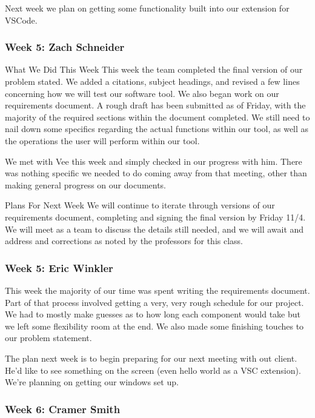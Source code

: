 Next week we plan on getting some functionality built into our extension for VSCode.

\subsubsection{Week 5: Zach Schneider}

What We Did This Week
This week the team completed the final version of our problem stated. We added a citations, subject headings, and revised a few lines concerning how we will test our software tool. We also began work on our requirements document. A rough draft has been submitted as of Friday, with the majority of the required sections within the document completed. We still need to nail down some specifics regarding the actual functions within our tool, as well as the operations the user will perform within our tool. 

We met with Vee this week and simply checked in our progress with him. There was nothing specific we needed to do coming away from that meeting, other than making general progress on our documents.

Plans For Next Week
We will continue to iterate through versions of our requirements document, completing and signing the final version by Friday 11/4. We will meet as a team to discuss the details still needed, and we will await and address and corrections as noted by the professors for this class.


\subsubsection{Week 5: Eric Winkler}

This week the majority of our time was spent writing the requirements document. Part of that process involved getting a very, very rough schedule for our project. We had to mostly make guesses as to how long each component would take but we left some flexibility room at the end. We also made some finishing touches to our problem statement. 

The plan next week is to begin preparing for our next meeting with out client. He'd like to see something on the screen (even hello world as a VSC extension). We're planning on getting our windows set up.

\subsubsection{Week 6: Cramer Smith}

